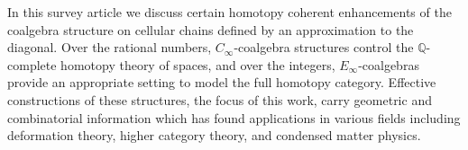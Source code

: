 
In this survey article we discuss certain homotopy coherent enhancements of the coalgebra structure on cellular chains defined by an approximation to the diagonal.
Over the rational numbers, $C_\infty$-coalgebra structures control the $\mathbb Q$-complete homotopy theory of spaces, and over the integers, $E_\infty$-coalgebras provide an appropriate setting to model the full homotopy category.
Effective constructions of these structures, the focus of this work, carry geometric and combinatorial information which has found applications in various fields including deformation theory, higher category theory, and condensed matter physics.